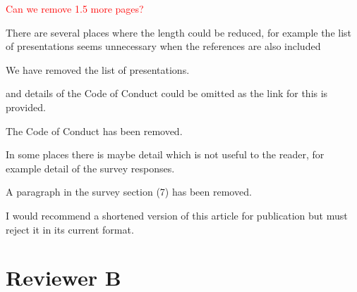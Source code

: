 \documentclass[11pt]{article}
\begin{document}
\textcolor{red}{Can we remove 1.5 more pages?}

\begin{quoting}
There are several places where the length could be reduced, for example the list of presentations seems unnecessary when the references are also included 

\end{quoting}

We have removed the list of presentations.

\begin{quoting}

and details of the Code of Conduct could be omitted as the link for this is provided. 

\end{quoting}

The Code of Conduct has been removed.

\begin{quoting}

 In some places there is maybe detail which is not useful to the reader, for example detail of the survey responses.
 
\end{quoting}

A paragraph in the survey section (7) has been removed.

\begin{quoting}
I would recommend a shortened version of this article for publication but must reject it in its current format.
\end{quoting}


\section*{Reviewer B}
\end{document}
